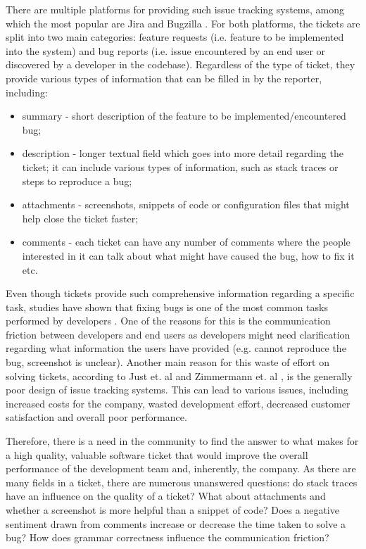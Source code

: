 \documentclass{mpaper}
\begin{document}
There are multiple platforms for providing such issue tracking systems, among which
the most popular are Jira \cite{jira} and Bugzilla \cite{bugzilla}. For both platforms,
the tickets are split into two main categories: feature requests (i.e. feature to be 
implemented into the system) and bug reports (i.e. issue encountered by an end user or
discovered by a developer in the codebase). Regardless of the type of ticket, they provide
various types of information that can be filled in by the reporter, including:
  \begin{itemize}
    \item summary - short description of the feature to be implemented/encountered bug;
    \item description - longer textual field which goes into more detail regarding the ticket;
    it can include various types of information, such as stack traces or steps to reproduce a bug;
    \item attachments - screenshots, snippets of code or configuration files that might help
    close the ticket faster;
    \item comments - each ticket can have any number of comments where the people interested in 
    it can talk about what might have caused the bug, how to fix it etc.
  \end{itemize}

Even though tickets provide such comprehensive information regarding a specific task, studies have shown 
that fixing bugs is one of the most common tasks performed by developers \cite{latoza2006maintaining}. One of
the reasons for this is the communication friction between developers and end users \cite{Korkala2014WasteIdentification}
as developers might need clarification regarding what information the users have provided (e.g. cannot reproduce the bug, 
screenshot is unclear). Another main reason for this waste of effort on solving tickets, according to 
Just et. al \cite{just2008towards} and Zimmermann et. al \cite{zimmermann2009improving}, is the generally poor design of issue 
tracking systems. This can lead to various issues, including increased costs for the company, wasted development effort, 
decreased customer satisfaction and overall poor performance.

Therefore, there is a need in the community to find the answer to what makes for a high quality, valuable software ticket 
that would improve the overall performance of the development team and, inherently, the company. As there are many 
fields in a ticket, there are numerous unanswered questions: do stack traces have an influence on the quality
of a ticket? What about attachments and whether a screenshot is more helpful than a snippet of code? Does a negative sentiment
drawn from comments increase or decrease the time taken to solve a bug? How does grammar correctness influence the 
communication friction?
\end{document}
